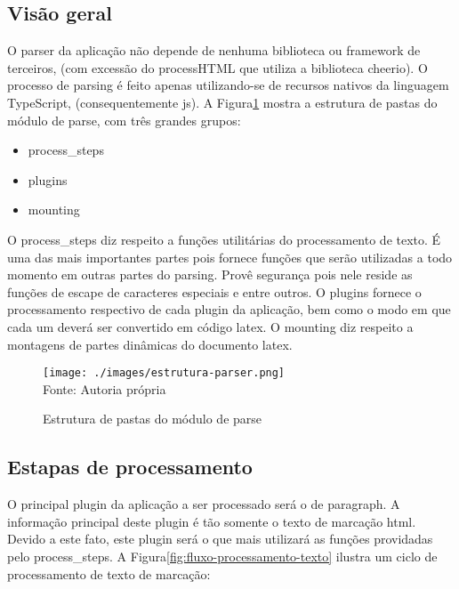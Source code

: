 \subsection{Visão geral}

O parser da aplicação não depende de nenhuma biblioteca
ou framework de terceiros,
(com excessão do processHTML que utiliza a biblioteca cheerio).
O processo de parsing é feito
apenas utilizando-se de recursos nativos da linguagem
TypeScript, (consequentemente
\acrshort{js}).
A
Figura\ref{fig:estrutura-parser}
mostra a estrutura de pastas do módulo de parse, com três grandes
grupos:

\begin{itemize}
        
	\item process\_steps
	\item plugins
	\item mounting
    
\end{itemize}

O process\_steps diz respeito a funções utilitárias do processamento de texto.
É uma das mais importantes partes pois fornece funções que serão utilizadas a todo
momento em outras partes do parsing. Provê segurança pois nele reside as funções
de escape de caracteres especiais e entre outros.
O plugins fornece o processamento respectivo de cada plugin da aplicação,
bem como o modo em que cada um deverá ser convertido em código
\acrshort{latex}.
O mounting diz respeito a montagens de partes dinâmicas do documento
\acrshort{latex}.

\begin{figure}[H]
    \centering
    \caption{Estrutura de pastas do módulo de parse}
    \texttt{[image: ./images/estrutura-parser.png]}
    \label{fig:estrutura-parser} \\
    \textnormal{\fontsize{10pt}{12pt}Fonte: Autoria própria}
\end{figure}

\subsection{Estapas de processamento}

O principal plugin da aplicação a ser processado será o de paragraph.
A informação principal deste plugin é tão somente o texto de marcação
\acrshort{html}. Devido a este fato, este plugin
será o que mais utilizará as funções providadas pelo process\_steps.
A
Figura\ref{fig:fluxo-processamento-texto}
ilustra um ciclo de processamento de texto de marcação:

